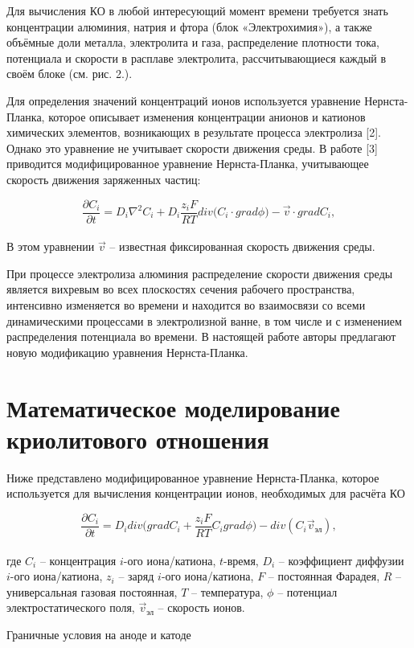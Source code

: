 \documentclass{article}
\begin{document}
Для вычисления КО в любой интересующий момент времени требуется знать концентрации алюминия, натрия и фтора (блок «Электрохимия»), а также объёмные доли металла, электролита и газа, распределение плотности тока, потенциала и скорости в расплаве электролита, рассчитывающиеся каждый в своём блоке (см. рис. 2.). 

Для определения значений концентраций ионов используется уравнение Нернста-Планка, которое описывает изменения концентрации анионов и катионов химических элементов, возникающих в результате процесса электролиза [2]. Однако это уравнение не учитывает скорости движения среды. В работе [3] приводится модифицированное уравнение Нернста-Планка, учитывающее скорость движения заряженных частиц:

\[\frac{\partial C_i}{\partial t} = D_i\nabla^{2}C_i+D_i\frac{z_iF}{RT}div\big(C_i \cdot grad\phi\big) - \overrightarrow{v} \cdot gradC_i,  
\]
\\
В этом уравнении $\overrightarrow{v}$ – известная фиксированная скорость движения среды. 

При процессе электролиза алюминия распределение скорости движения среды является вихревым во всех плоскостях сечения рабочего пространства, интенсивно изменяется во времени и находится во взаимосвязи со всеми динамическими процессами в электролизной ванне, в том числе и с изменением распределения потенциала во времени. В настоящей работе авторы предлагают новую модификацию уравнения Нернста-Планка.

\section{Математическое моделирование криолитового отношения}

Ниже представлено модифицированное уравнение Нернста-Планка, которое используется для вычисления концентрации ионов, необходимых для расчёта КО

\[\frac{\partial C_i}{\partial t} = D_idiv\bigg(gradC_i + \frac{z_iF}{RT}C_igrad\phi\bigg) - div(C_i \overrightarrow{v}_{\text{эл}}),  \]
\\
где $C_i$ – концентрация $i$-ого иона/катиона, $t$-время, $D_i$ – коэффициент диффузии $i$-ого иона/катиона, $z_i$ – заряд $i$-ого иона/катиона, $F$ – постоянная Фарадея, $R$ – универсальная газовая постоянная, $T$ – температура, $\phi$ – потенциал электростатического поля, $\overrightarrow{v}_\text{эл}$ – скорость ионов.

Граничные условия на аноде и катоде
\end{document}
